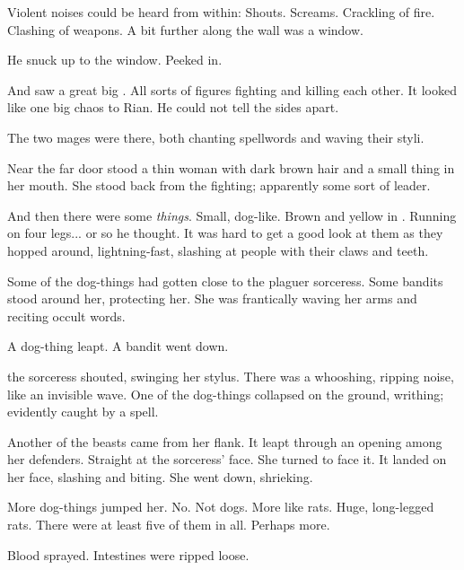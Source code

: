 Violent noises could be heard from within: 
Shouts.
Screams.
Crackling of fire.
Clashing of weapons. 
A bit further along the wall was a window. 

He snuck up to the window. 
Peeked in. 

\begin{comment}
\subsection{Rian sees mages die}
\end{comment}

And saw a great big \melee. 
All sorts of figures fighting and killing each other. 
It looked like one big chaos to Rian. 
He could not tell the sides apart. 

The two mages were there, both chanting spellwords and waving their styli. 

Near the far door stood a thin woman with dark brown hair and a small thing in her mouth.
She stood back from the fighting; apparently some sort of leader. 

And then there were some \emph{things}. 
Small, dog-like. 
Brown and yellow in \colour. 
Running on four legs... or so he thought. 
It was hard to get a good look at them as they hopped around, lightning-fast, slashing at people with their claws and teeth. 

Some of the dog-things had gotten close to the plaguer sorceress. 
Some bandits stood around her, protecting her. 
She was frantically waving her arms and reciting occult words. 

A dog-thing leapt. 
A bandit went down. 

 the sorceress shouted, swinging her stylus. 
There was a whooshing, ripping noise, like an invisible wave. 
One of the dog-things collapsed on the ground, writhing; evidently caught by a spell. 

Another of the beasts came from her flank. 
It leapt through an opening among her defenders. 
Straight at the sorceress' face. 
She turned to face it. 
It landed on her face, slashing and biting. 
She went down, shrieking. 

More dog-things jumped her. 
No. 
Not dogs.
More like rats. 
Huge, long-legged rats. 
There were at least five of them in all. 
Perhaps more. 

Blood sprayed. 
Intestines were ripped loose. 

